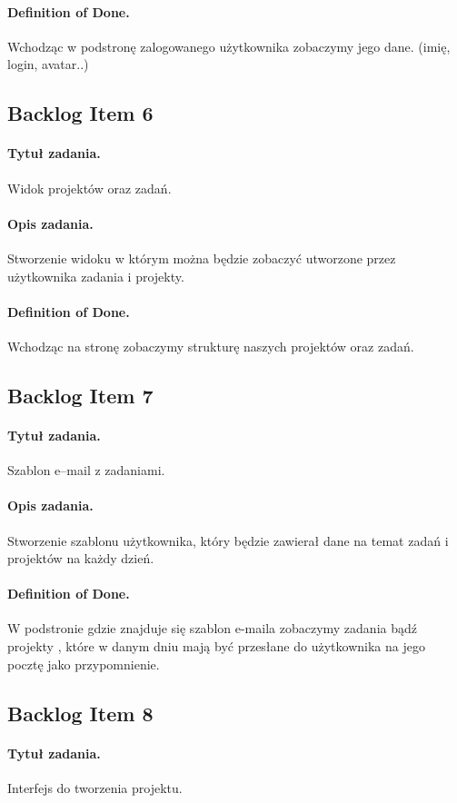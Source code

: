 \documentclass[a4paper]{article}
\begin{document}
\paragraph{Definition of Done.} Wchodząc w podstronę zalogowanego użytkownika zobaczymy jego dane. (imię, login, avatar..)

\subsection{Backlog Item 6} 
\paragraph{Tytuł zadania.} Widok projektów oraz zadań.
\paragraph{Opis zadania.} Stworzenie widoku w którym można będzie zobaczyć utworzone przez użytkownika zadania i projekty.
\paragraph{Definition of Done.} Wchodząc na stronę zobaczymy strukturę naszych projektów oraz zadań.

\subsection{Backlog Item 7} 
\paragraph{Tytuł zadania.} Szablon e--mail z zadaniami.
\paragraph{Opis zadania.} Stworzenie szablonu użytkownika, który będzie zawierał dane na temat zadań i projektów na każdy dzień.
\paragraph{Definition of Done.} W podstronie gdzie znajduje się szablon e-maila zobaczymy zadania bądź projekty , które w danym dniu mają być przesłane do użytkownika na jego pocztę jako przypomnienie.

\subsection{Backlog Item 8} 
\paragraph{Tytuł zadania.} Interfejs do tworzenia projektu.
\end{document}
